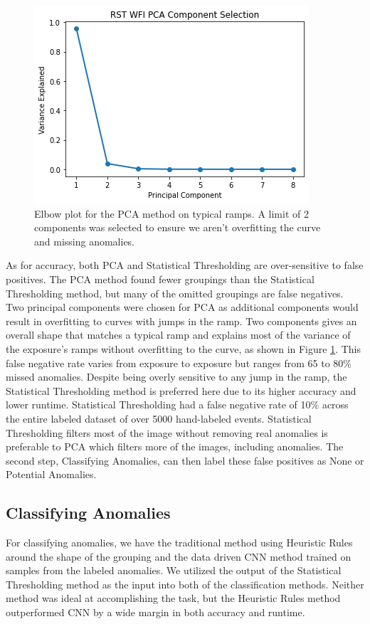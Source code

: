 \begin{figure}
    \centering
    \includegraphics[width=.5\linewidth]{figs/rst/elbow.png}
    \caption[Elbow Plot of PCA for Typical Ramps in WFI Detector Data]{Elbow plot for the PCA method on typical ramps. A limit of 2 components was selected to ensure we aren't overfitting the curve and missing anomalies.}
    \label{rst/fig:elbow}
\end{figure}

As for accuracy, both PCA and Statistical Thresholding are over-sensitive to false positives.
The PCA method found fewer groupings than the Statistical Thresholding method, but many of the omitted groupings are false negatives.
Two principal components were chosen for PCA as additional components would result in overfitting to curves with jumps in the ramp.
Two components gives an overall shape that matches a typical ramp and explains most of the variance of the exposure's ramps without overfitting to the curve, as shown in Figure \ref{rst/fig:elbow}.
This false negative rate varies from exposure to exposure but ranges from 65 to 80\% missed anomalies. 
Despite being overly sensitive to any jump in the ramp, the Statistical Thresholding method is preferred here due to its higher accuracy and lower runtime.
Statistical Thresholding had a false negative rate of 10\% across the entire labeled dataset of over 5000 hand-labeled events. 
Statistical Thresholding filters most of the image without removing real anomalies is preferable to PCA which filters more of the images, including anomalies. 
The second step, Classifying Anomalies, can then label these false positives as None or Potential Anomalies. 

\subsection{Classifying Anomalies}
For classifying anomalies, we have the traditional method using Heuristic Rules around the shape of the grouping and the data driven CNN method trained on samples from the labeled anomalies. 
We utilized the output of the Statistical Thresholding method as the input into both of the classification methods. 
Neither method was ideal at accomplishing the task, but the Heuristic Rules method outperformed CNN by a wide margin in both accuracy and runtime.


